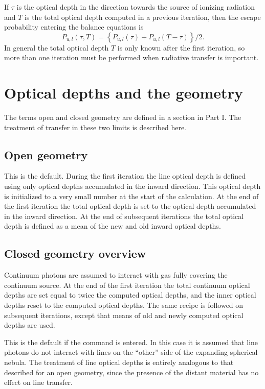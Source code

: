 If $\tau$ is the optical depth in the direction towards the source of ionizing
radiation and $T$ is the total optical depth computed in a previous iteration,
then the escape probability entering the balance equations is
\begin{equation}
{P_{u,l}}\left( {\tau ,T} \right) = \left\{ {{P_{u,l}}\left( \tau  \right)
+ {P_{u,l}}\left( {T - \tau } \right)} \right\}/2.
\end{equation}
In general the total optical depth $T$ is only known after the first iteration,
so more than one iteration must be performed when radiative transfer is
important.

\section{Optical depths and the geometry }

The terms open and closed geometry are defined in a section in Part I.
The treatment of transfer in these two limits is described here.

\subsection{Open geometry }

This is the default.  During the first iteration the line optical depth
is defined using only optical depths accumulated in the inward direction.
This optical depth is initialized to a very small number at the start of
the calculation.
At the end of the first iteration the total optical depth
is set to the optical depth accumulated in the inward direction.
At the
end of subsequent iterations the total optical depth is defined as a mean
of the new and old inward optical depths.

\subsection{Closed geometry overview }

Continuum photons are assumed to interact with gas fully covering the
continuum source.  At the end of the first iteration the total continuum
optical depths are set equal to twice the computed optical depths, and the
inner optical depths reset to the computed optical depths.
The same recipe
is followed on subsequent iterations, except that means of old and newly
computed optical depths are used.

  This is the default if the
 command
is entered.  In this case it is assumed that line photons do not interact
with lines on the ``other'' side of the expanding spherical nebula.  The
treatment of line optical depths is entirely analogous to that described
for an open geometry, since the presence of the distant material has no
effect on line transfer.

